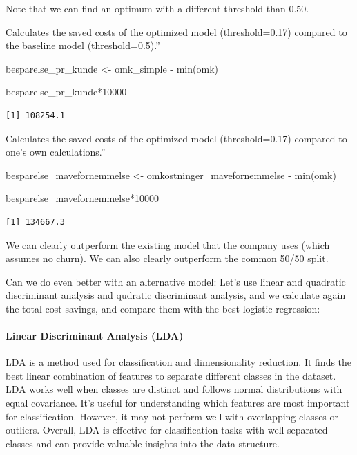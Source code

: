 \documentclass[
  letterpaper,
  DIV=11,
  numbers=noendperiod]{scrartcl}
\let\oldparagraph\paragraph
\renewcommand{\paragraph}[1]{\oldparagraph{#1}\mbox{}}
\newenvironment{Shaded}{\begin{snugshade}}{\end{snugshade}}
\newcommand{\DecValTok}[1]{\textcolor[rgb]{0.68,0.00,0.00}{#1}}
\newcommand{\FunctionTok}[1]{\textcolor[rgb]{0.28,0.35,0.67}{#1}}
\newcommand{\NormalTok}[1]{\textcolor[rgb]{0.00,0.23,0.31}{#1}}
\newcommand{\OtherTok}[1]{\textcolor[rgb]{0.00,0.23,0.31}{#1}}
\newcommand{\SpecialCharTok}[1]{\textcolor[rgb]{0.37,0.37,0.37}{#1}}
\begin{document}
Note that we can find an optimum with a different threshold than 0.50.

Calculates the saved costs of the optimized model (threshold=0.17)
compared to the baseline model (threshold=0.5).''

\begin{Shaded}
\begin{Highlighting}[]
\NormalTok{besparelse\_pr\_kunde }\OtherTok{\textless{}{-}}\NormalTok{ omk\_simple }\SpecialCharTok{{-}} \FunctionTok{min}\NormalTok{(omk)}

\NormalTok{besparelse\_pr\_kunde}\SpecialCharTok{*}\DecValTok{10000}
\end{Highlighting}
\end{Shaded}

\begin{verbatim}
[1] 108254.1
\end{verbatim}

Calculates the saved costs of the optimized model (threshold=0.17)
compared to one's own calculations.''

\begin{Shaded}
\begin{Highlighting}[]
\NormalTok{besparelse\_mavefornemmelse }\OtherTok{\textless{}{-}}\NormalTok{ omkostninger\_mavefornemmelse }\SpecialCharTok{{-}} \FunctionTok{min}\NormalTok{(omk)}

\NormalTok{besparelse\_mavefornemmelse}\SpecialCharTok{*}\DecValTok{10000}
\end{Highlighting}
\end{Shaded}

\begin{verbatim}
[1] 134667.3
\end{verbatim}

We can clearly outperform the existing model that the company uses
(which assumes no churn). We can also clearly outperform the common
50/50 split.

Can we do even better with an alternative model: Let's use linear and
quadratic discriminant analysis and qudratic discriminant analysis, and
we calculate again the total cost savings, and compare them with the
best logistic regression:

\paragraph{Linear Discriminant Analysis
(LDA)}\label{linear-discriminant-analysis-lda}

LDA is a method used for classification and dimensionality reduction. It
finds the best linear combination of features to separate different
classes in the dataset. LDA works well when classes are distinct and
follows normal distributions with equal covariance. It's useful for
understanding which features are most important for classification.
However, it may not perform well with overlapping classes or outliers.
Overall, LDA is effective for classification tasks with well-separated
classes and can provide valuable insights into the data structure.
\end{document}
